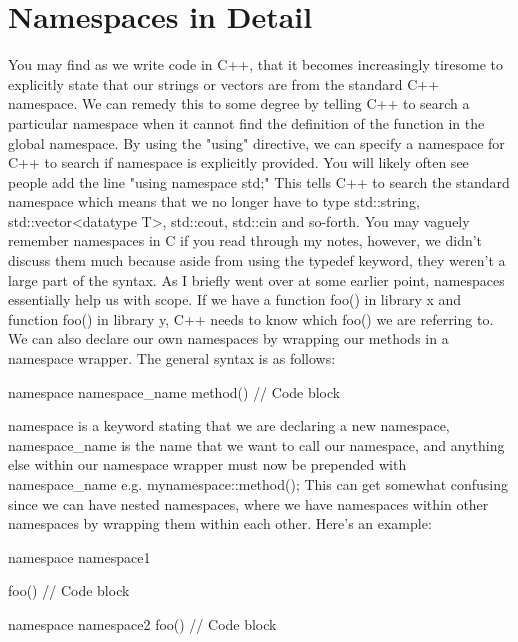 \documentclass{article}
\begin{document}
\section{Namespaces in Detail}

You may find as we write code in C++, that it becomes increasingly tiresome to explicitly state that our
strings or vectors are from the standard C++ namespace. We can remedy this to some degree by telling C++ to
search a particular namespace when it cannot find the definition of the function in the global namespace. By
using the "using" directive, we can specify a namespace for C++ to search if namespace is explicitly provided.
You will likely often see people add the line "using namespace std;" This tells C++ to search the standard
namespace which means that we no longer have to type std::string, std::vector<datatype T>, std::cout, std::cin
and so-forth. You may vaguely remember namespaces in C if you read through my notes, however, we didn't discuss
them much because aside from using the typedef keyword, they weren't a large part of the syntax. As I briefly
went over at some earlier point, namespaces essentially help us with scope. If we have a function foo() in
library x and function foo() in library y, C++ needs to know which foo() we are referring to. We can also
declare our own namespaces by wrapping our methods in a namespace wrapper. The general syntax is as follows:

\begin{cpplst}

namespace namespace_name {
    method() {
        // Code block
    }
}

\end{cpplst}

namespace is a keyword stating that we are declaring a new namespace, namespace\_name is the name that we want
to call our namespace, and anything else within our namespace wrapper must now be prepended with
namespace\_name e.g. mynamespace::method(); This can get somewhat confusing since we can have nested
namespaces, where we have namespaces within other namespaces by wrapping them within each other. Here's an
example:

\begin{cpplst}

namespace namespace1 {
    foo() {
        // Code block
    }

    namespace namespace2 {
        foo() {
            // Code block
        }
    }
}

\end{cpplst}
\end{document}
